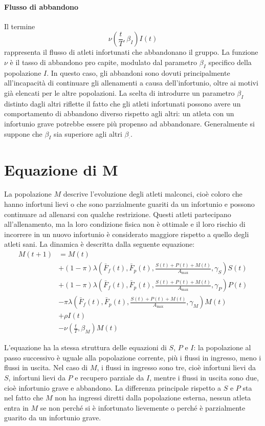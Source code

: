 \paragraph{Flusso di abbandono}
Il termine
\[
    \nu\left(\frac{t}{T}, \beta_I\right) I(t)
\]
rappresenta il flusso di atleti infortunati che abbandonano il gruppo. La funzione $\nu$ è il tasso di abbandono pro capite, modulato dal parametro $\beta_I$ specifico della popolazione $I$. In questo caso, gli abbandoni sono dovuti principalmente all'incapacità di continuare gli allenamenti a causa dell'infortunio, oltre ai motivi già elencati per le altre popolazioni. La scelta di introdurre un parametro $\beta_I$ distinto dagli altri riflette il fatto che gli atleti infortunati possono avere un comportamento di abbandono diverso rispetto agli altri: un atleta con un infortunio grave potrebbe essere più propenso ad abbandonare. Generalmente si suppone che $\beta_I$ sia superiore agli altri $\beta_\cdot$.

\section{Equazione di M}

La popolazione $M$ descrive l'evoluzione degli atleti malconci, cioè coloro che hanno infortuni lievi o che sono parzialmente guariti da un infortunio e possono continuare ad allenarsi con qualche restrizione. Questi atleti partecipano all'allenamento, ma la loro condizione fisica non è ottimale e il loro rischio di incorrere in un nuovo infortunio è considerato maggiore rispetto a quello degli atleti sani. La dinamica è descritta dalla seguente equazione:
\begin{align*}
    M(t+1) &= M(t) \\
        &+ (1 - \pi) \lambda\left(\bar{F}_f(t), \bar{F}_p(t), \frac{S(t) + P(t) + M(t)}{A_{\max}}, \gamma_S\right) S(t) \\
        &+ (1 - \pi) \lambda\left(\bar{F}_f(t), \bar{F}_p(t), \frac{S(t) + P(t) + M(t)}{A_{\max}}, \gamma_P\right) P(t) \\
        &- \pi \lambda\left(\bar{F}_f(t), \bar{F}_p(t), \frac{S(t) + P(t) + M(t)}{A_{\max}}, \gamma_M\right) M(t) \\
        &+ \rho I(t) \\
        &- \nu\left(\frac{t}{T}, \beta_M\right) M(t)
\end{align*}

L'equazione ha la stessa struttura delle equazioni di $S$, $P$ e $I$: la popolazione al passo successivo è uguale alla popolazione corrente, più i flussi in ingresso, meno i flussi in uscita. Nel caso di $M$, i flussi in ingresso sono tre, cioè infortuni lievi da $S$, infortuni lievi da $P$ e recupero parziale da $I$, mentre i flussi in uscita sono due, cioè infortunio grave e abbandono. La differenza principale rispetto a $S$ e $P$ sta nel fatto che $M$ non ha ingressi diretti dalla popolazione esterna, nessun atleta entra in $M$ se non perché si è infortunato lievemente o perché è parzialmente guarito da un infortunio grave.

